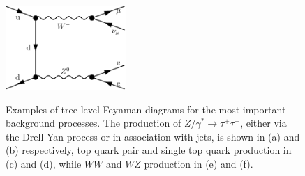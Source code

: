 \begin{figure}[tp]
\begin{center}
{            \includegraphics[height=3.2cm]{feyn_diagrams/diagrams/diboson2.pdf}
	}	
     \end{center}
    \caption{Examples of tree level Feynman diagrams for  the most important background processes. The production of 
	 $Z/\gamma^* \rightarrow \tau^+ \tau^- $, either via the Drell-Yan process or in association with jets,  is shown in (a) and (b)
	respectively, top quark pair and single top quark production in (c) and (d), while $WW$ and $WZ$ production in (e) and (f).
	}
   \label{fig:feyndiagBack}
\end{figure}



